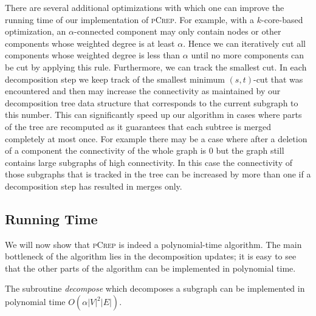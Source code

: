\documentclass[a4paper,UKenglish,cleveref, autoref, thm-restate,authorcolumns]{lipics-v2019}
\newcommand{\adjDel}{\textsc{pCrep}}
\begin{document}

There are several additional optimizations 
with which one can improve the running time of our implementation of \adjDel{}.
For example, with a $k$-core-based optimization, 
an $\alpha$-connected component 
	may only contain nodes or other components whose weighted degree is at least 
	$\alpha$. Hence we can iteratively cut all components whose weighted degree is 
	less than $\alpha$ until no more components can be cut by applying this rule.
Furthermore, we can track the smallest cut.
	In each decomposition step we keep track of the smallest minimum $(s,t)$-cut 
	that was encountered and then may increase the connectivity as maintained by 
	our decomposition tree data structure that corresponds to the current subgraph 
	to this number. This can significantly speed up our algorithm in cases where 
	parts of the tree are recomputed as it guarantees that each subtree is merged 
	completely at most once. For example there may be a case where after a deletion 
	of a component the connectivity of the whole graph is 0 but the graph still 
	contains large subgraphs of high connectivity. In this case the connectivity 
	of those subgraphs that is tracked in the tree can be increased by more than 
	one if a decomposition step has resulted in merges only.

\subsection{Running Time}
\label{run_time_sec}

We will now show that \adjDel{} is indeed a polynomial-time
algorithm.
The main bottleneck of the algorithm lies in the decomposition updates;
it is easy to see that 
the other parts of the algorithm can be implemented in polynomial time.

\begin{lemma}
	\label{dec_run_time_lem}
	The subroutine \textit{decompose} which decomposes a subgraph can be implemented in polynomial time $O(\alpha|V|^2|E|)$.
\end{lemma}
\end{document}
